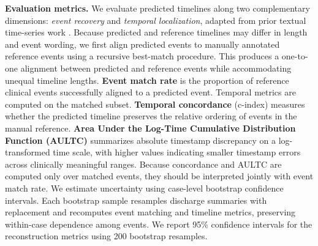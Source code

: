 \noindent\textbf{Evaluation metrics.} We evaluate predicted timelines along two complementary dimensions: \emph{event recovery} and \emph{temporal localization}, adapted from prior textual time-series work \cite{ch08:wang2025large,noroozizadeh2026reconstructing}. Because predicted and reference timelines may differ in length and event wording, we first align predicted events to manually annotated reference events using a recursive best-match procedure. This produces a one-to-one alignment between predicted and reference events while accommodating unequal timeline lengths. \textbf{Event match rate} is the proportion of reference clinical events successfully aligned to a predicted event. Temporal metrics are computed on the matched subset. \textbf{Temporal concordance} (c-index) measures whether the predicted timeline preserves the relative ordering of events in the manual reference. \textbf{Area Under the Log-Time Cumulative Distribution Function (AULTC)} summarizes absolute timestamp discrepancy on a log-transformed time scale, with higher values indicating smaller timestamp errors across clinically meaningful ranges. Because concordance and AULTC are computed only over matched events, they should be interpreted jointly with event match rate. 
We estimate uncertainty using case-level bootstrap confidence intervals.
Each bootstrap sample resamples discharge summaries with replacement and recomputes event matching and timeline metrics, preserving within-case dependence among events.
We report 95\% confidence intervals for the reconstruction metrics using 200 bootstrap resamples.


% 

